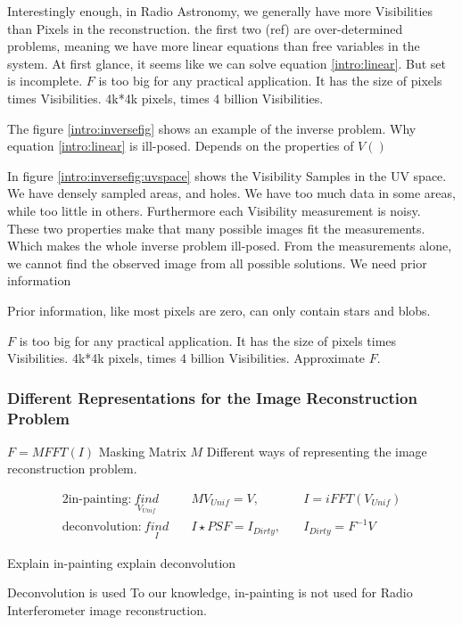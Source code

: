 Interestingly enough, in Radio Astronomy, we generally have more Visibilities than Pixels in the reconstruction. the first two (ref) are over-determined problems, meaning we have more linear equations than free variables in the system.
At first glance, it seems like we can solve equation \eqref{intro:linear}.
But set is incomplete.
$F$ is too big for any practical application. It has the size of pixels times Visibilities. 4k*4k pixels, times 4 billion Visibilities.

The figure \ref{intro:inversefig} shows an example of the inverse problem.
Why equation \eqref{intro:linear} is ill-posed. Depends on the properties of $V()$



In figure \ref{intro:inversefig:uvspace} shows the Visibility Samples in the UV space. We have densely sampled areas, and holes.
We have too much data in some areas, while too little in others. Furthermore each Visibility measurement is noisy. These two properties make that many possible images fit the measurements. Which makes the whole inverse problem ill-posed.
From the measurements alone, we cannot find the observed image from all possible solutions. We need prior information

Prior information, like most pixels are zero, can only contain stars and blobs.



$F$ is too big for any practical application. It has the size of pixels times Visibilities. 4k*4k pixels, times 4 billion Visibilities. Approximate $F$.

\subsubsection{Different Representations for the Image Reconstruction Problem}
$F = M FFT(I)$
Masking Matrix $M$
Different ways of representing the image reconstruction problem.

\begin{alignat}{2}
\text{in-painting:}\: \underset{V_{Unif}}{find}&\quad MV_{Unif} = V,  \quad &I = iFFT(V_{Unif})\\
\text{deconvolution:}\: \underset{I}{find}&\quad I \star PSF = I_{Dirty},  \quad &I_{Dirty} = F^{-1}V
\end{alignat}

Explain in-painting
explain deconvolution

Deconvolution is used
To our knowledge, in-painting is not used for Radio Interferometer image reconstruction.

